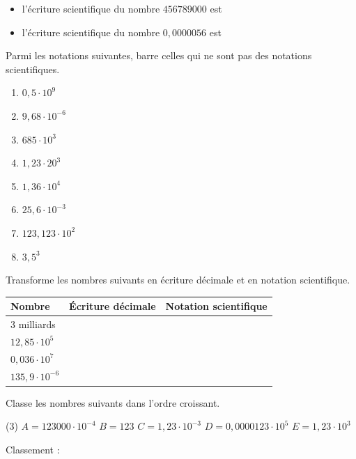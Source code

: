 \documentclass[../math2.tex]{subfiles}
\begin{document}

\exemples
\begin{itemize}[label=$\bullet$]
	\item l'écriture scientifique du nombre $456 789 000$ est \dotfill
	\item l'écriture scientifique du nombre $0,0000056$ est \dotfill
\end{itemize}

\begin{exercise}
	Parmi les notations suivantes, barre celles qui ne sont pas des notations scientifiques.
	\begin{enumerate}[cols=4, label=\,] 
		\item $0,5\cdot 10^9$
		\item $9,68\cdot 10^{-6}$
		\item $685\cdot 10^3$
		\item $1,23\cdot 20^3$
		\item $1,36\cdot 10^4$
		\item $25,6\cdot 10^{-3}$
		\item $123,123\cdot 10^2$
		\item $3,5^3$
	\end{enumerate}
\end{exercise}

\begin{exercise}
	Transforme les nombres suivants en écriture décimale et en notation scientifique.

	\begin{tabularx}{\linewidth}{|Y|Y|Y|}
		\hline
		\textbf{Nombre}      & \textbf{Écriture décimale} & \textbf{Notation scientifique} \\ milliards          &                            &                                \\\hline
		$12,85\cdot 10^5$    &                            &                                \\\hline
		$0,036\cdot 10^7$    &                            &                                \\\hline
		$135,9\cdot 10^{-6}$ &                            &                                \\\hline
	\end{tabularx}
\end{exercise}

\begin{exercise}
	Classe les nombres suivants dans l'ordre croissant.
	\begin{tasks}[label=\,](3)
		\task $A=123000\cdot 10^{-4}$
		\task $B=123$
		\task $C=1,23\cdot 10^{-3}$
		\task $D=0,0000123\cdot 10^5$
		\task $E=1,23\cdot 10^3$
	\end{tasks}

	Classement :
\end{exercise}
\end{document}
